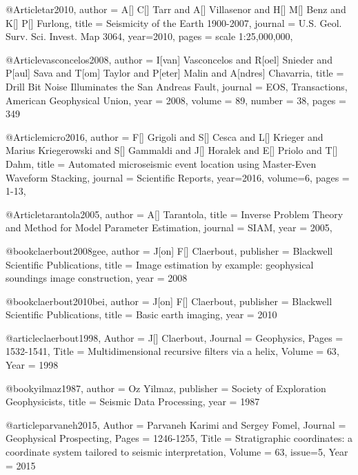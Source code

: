 @Article{tar2010,
  author =	 {A[] C[] Tarr and A[] Villasenor and H[] M[] Benz and K[] P[] Furlong},
  title =	 {Seismicity of the {E}arth 1900-2007},
  journal =	 {U.S. Geol. Surv. Sci. Invest. Map 3064},
  year=2010,
  pages =	 {scale 1:25,000,000},
}

@Article{vasconcelos2008,
   author = { I[van] Vasconcelos and R[oel] Snieder and P[aul] Sava and T[om] Taylor and P[eter] Malin and A[ndres] Chavarria},
   title = {Drill Bit Noise Illuminates the {S}an {A}ndreas Fault},
   journal = {{EOS}, {T}ransactions, {A}merican {G}eophysical {U}nion},
   year = {2008},
   volume = {89},
   number = {38},
   pages = {349}
}

@Article{micro2016,
  author =	 {F[] Grigoli and S[] Cesca and L[] Krieger and Marius Kriegerowski and S[] Gammaldi and J[] Horalek and E[] Priolo and T[] Dahm},
  title =	 {Automated microseismic event location using Master-Even Waveform Stacking},
  journal =	 {Scientific Reports},
  year=2016,
  volume=6,
  pages =	 {1-13},
}





@Article{tarantola2005,
  author = 	 {A[] Tarantola},
  title = 	 {Inverse Problem Theory and Method for Model Parameter Estimation},
  journal = 	 {SIAM},
  year = 	 2005,
}







@book{claerbout2008gee,
   author = {J[on] F[] Claerbout},
   publisher = {Blackwell Scientific Publications},
   title = {Image estimation by example: geophysical soundings image construction},
   year = {2008}
}

@book{claerbout2010bei,
   author = {J[on] F[] Claerbout},
   publisher = {Blackwell Scientific Publications},
   title = {Basic earth imaging},
   year = {2010}
}

@article{claerbout1998,
	Author = {J[] Claerbout},
	Journal = {Geophysics},
	Pages = {1532-1541},
	Title = {Multidimensional recursive filters via a helix},
	Volume = {63},
	Year = {1998}}

@book{yilmaz1987,
   author = {Oz Yilmaz},
   publisher = {Society of Exploration Geophysicists},
   title = {Seismic Data Processing},
   year = {1987}
}

@article{parvaneh2015,
	Author = {Parvaneh Karimi and Sergey Fomel},
	Journal = {Geophysical Prospecting},
	Pages = {1246-1255},
	Title = {Stratigraphic coordinates: a coordinate system tailored to seismic interpretation},
	Volume = {63},
	issue=5,
	Year = {2015}}
	

